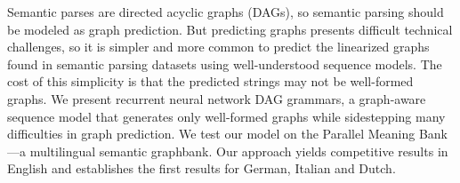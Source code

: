 Semantic parses are directed acyclic graphs (DAGs), so semantic parsing should be modeled as graph prediction. But predicting graphs presents difficult technical challenges, so it is simpler and more common to predict the linearized graphs found in semantic parsing datasets using well-understood sequence models. The cost of this simplicity is that the predicted strings may not be well-formed graphs. We present recurrent neural network DAG grammars, a graph-aware sequence model that generates only well-formed graphs while sidestepping many difficulties in graph prediction. We test our model on the Parallel Meaning Bank—a multilingual semantic graphbank. Our approach yields competitive results in English and establishes the first results for German, Italian and Dutch.
